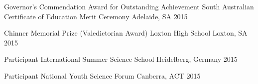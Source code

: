 \begin{cvhonors}
  \cvhonor
    {Governor’s Commendation Award for Outstanding Achievement} %
    {South Australian Certificate of Education Merit Ceremony} %
    {Adelaide, SA} %
    {2015} %
    
  \cvhonor
    {Chinner Memorial Prize (Valedictorian Award)} %
    {Loxton High School} %
    {Loxton, SA} %
    {2015} %




\end{cvhonors}




\begin{cvhonors}




  \cvhonor
    {Participant} %
    {International Summer Science School} %
    {Heidelberg, Germany} %
    {2015} %

  \cvhonor
    {Participant} %
    {National Youth Science Forum} %
    {Canberra, ACT} %
    {2015} %

\end{cvhonors}
